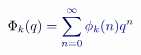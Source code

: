 \documentclass[12pt]{article}
\begin{document}
\makeatletter
\renewcommand*{\@textcolor}[3]{%
  \protect\leavevmode
  \begingroup
    \color#1{#2}#3%
  \endgroup
}
\makeatother
\begin{displaymath}
\mathcolor[RGB]{0,0,15}{\Phi} _ { \mathcolor[RGB]{0,0,30}{k} } \mathcolor[RGB]{0,0,45}{(} \mathcolor[RGB]{0,0,60}{q} \mathcolor[RGB]{0,0,75}{)} \mathcolor[RGB]{0,0,90}{=} \mathcolor[RGB]{0,0,105}{\sum} _ { \mathcolor[RGB]{0,0,120}{n} \mathcolor[RGB]{0,0,135}{=} \mathcolor[RGB]{0,0,150}{0} } ^ { \mathcolor[RGB]{0,0,165}{\infty} } \mathcolor[RGB]{0,0,180}{\phi} _ { \mathcolor[RGB]{0,0,195}{k} } \mathcolor[RGB]{0,0,210}{(} \mathcolor[RGB]{0,0,225}{n} \mathcolor[RGB]{0,0,240}{)} \mathcolor[RGB]{0,0,255}{q} ^ { \mathcolor[RGB]{0,15,0}{n} }
\end{displaymath}
\end{document}
